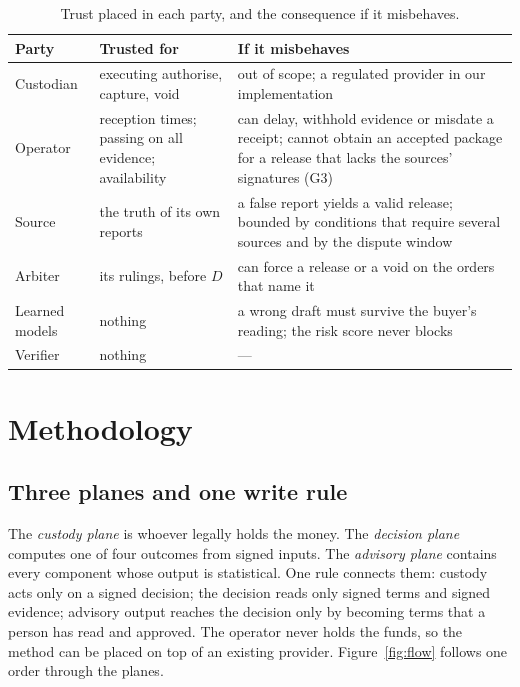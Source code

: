 \documentclass[10pt,a4paper]{article}
\theoremstyle{tight}
\begin{document}
\begin{table}[t]
\centering\small
\caption{Trust placed in each party, and the consequence if it misbehaves.}
\label{tab:trust}
\begin{tabular}{@{}p{2.3cm}p{5.0cm}p{8.0cm}@{}}
\toprule
Party & Trusted for & If it misbehaves \\
\midrule
Custodian & executing authorise, capture, void & out of scope; a regulated provider in our implementation \\
Operator & reception times; passing on all evidence; availability & can delay, withhold evidence or misdate a
receipt; cannot obtain an accepted package for a release that lacks the sources' signatures (G3) \\
Source & the truth of its own reports & a false report yields a valid release; bounded by conditions that require
several sources and by the dispute window \\
Arbiter & its rulings, before $D$ & can force a release or a void on the orders that name it \\
Learned models & nothing & a wrong draft must survive the buyer's reading; the risk score never blocks \\
Verifier & nothing & --- \\
\bottomrule
\end{tabular}
\end{table}

\section{Methodology}\label{sec:method}

\subsection{Three planes and one write rule}

The \emph{custody plane} is whoever legally holds the money. The \emph{decision plane} computes one of four outcomes
from signed inputs. The \emph{advisory plane} contains every component whose output is statistical. One rule
connects them: custody acts only on a signed decision; the decision reads only signed terms and signed evidence;
advisory output reaches the decision only by becoming terms that a person has read and approved. The operator never
holds the funds, so the method can be placed on top of an existing provider. Figure~\ref{fig:flow} follows one order
through the planes.
\end{document}
